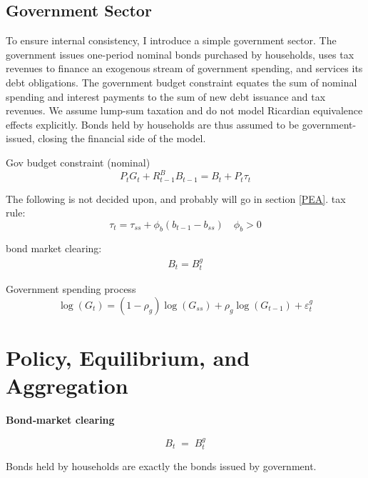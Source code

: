 \documentclass[11pt,preprint]{elsarticle}
\numberwithin{equation}{section}
\numberwithin{figure}{section}
\numberwithin{table}{section}
\begin{document}
\newpage

\subsection{Government Sector}\label{government-sector}

To ensure internal consistency, I introduce a simple government sector.
The government issues one-period nominal bonds purchased by households,
uses tax revenues to finance an exogenous stream of government spending,
and services its debt obligations. The government budget constraint
equates the sum of nominal spending and interest payments to the sum of
new debt issuance and tax revenues. We assume lump-sum taxation and do
not model Ricardian equivalence effects explicitly. Bonds held by
households are thus assumed to be government-issued, closing the
financial side of the model.

Gov budget constraint (nominal) \begin{equation}
P_t G_t + R^B_{t-1} B_{t-1} = B_t + P_t \tau_t \label{Gov_Budget}
\end{equation}

The following is not decided upon, and probably will go in section
\ref{PEA}. tax rule: \begin{equation}
\tau_t = \tau_{ss} + \phi_b (b_{t-1} - b_{ss}) \quad \phi_b > 0 \label{Tax_Rule}
\end{equation}

bond market clearing: \begin{align*}
B_t = B^g_t 
\end{align*}

Government spending process \begin{equation}
\log(G_t) = (1-\rho_g)\log(G_{ss}) + \rho_g \log(G_{t-1}) + \varepsilon^g_t \label{Gov_Spending}
\end{equation}

\section{\texorpdfstring{Policy, Equilibrium, and Aggregation
\label{PEA}}{Policy, Equilibrium, and Aggregation }}\label{policy-equilibrium-and-aggregation}

\textbf{Bond‐market clearing}

\[
     B_t \;=\; B^g_t
     \tag{Bond market clear}
\]

Bonds held by households are exactly the bonds issued by government.
\end{document}
